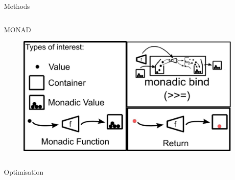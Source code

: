 \documentclass[final]{beamer}
\newlength{\onecolwid}
\newlength{\twocolwid}
\begin{document}
\begin{frame}[t]
\begin{columns}[t]
\begin{column}{\twocolwid}
\begin{columns}[t,totalwidth=\twocolwid]
\begin{column}{\onecolwid}
\begin{block}{Methods}
\end{block}


\end{column} %

\end{columns} %

\begin{alertblock}{MONAD}

\begin{figure}
\includegraphics[width=0.8\linewidth]{img/monad.jpg}

\end{figure}
\end{alertblock}


\begin{columns}[t,totalwidth=\twocolwid] %

\begin{column}{\onecolwid} %


\begin{block}{Optimisation}


\end{block}
\end{column}
\end{columns}
\end{column}
\end{columns}
\end{frame}
\end{document}
